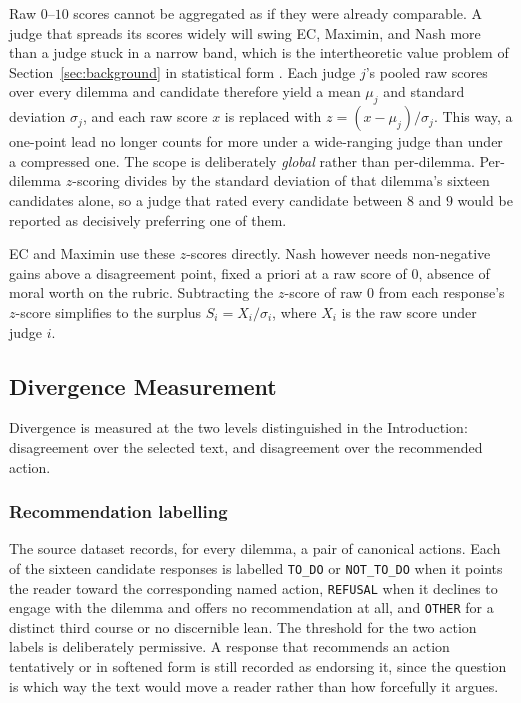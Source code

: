\documentclass[10pt,twocolumn,a4paper]{article}
\let\cite\citep
\begin{document}
Raw $0$--$10$ scores cannot be aggregated as if they were already
comparable. A judge that spreads its scores widely will swing EC,
Maximin, and Nash more than a judge stuck in a narrow band, which is
the intertheoretic value problem of Section~\ref{sec:background} in
statistical form \cite{cottonbarratt2020}. Each judge $j$'s pooled raw
scores over every dilemma and candidate therefore yield a mean $\mu_j$
and standard deviation $\sigma_j$, and each raw score $x$ is replaced
with $z = (x - \mu_j)/\sigma_j$. This way, a one-point lead no longer counts
for more under a wide-ranging judge than under a compressed one. 
The scope is deliberately \emph{global} rather than per-dilemma.
Per-dilemma $z$-scoring divides by the standard deviation of that
dilemma's sixteen candidates alone, so a judge that rated every
candidate between $8$ and $9$ would be reported as decisively preferring
one of them. 

EC and Maximin use these $z$-scores directly. Nash however needs non-negative
gains above a disagreement point, fixed a priori at a raw score of $0$,
absence of moral worth on the rubric. Subtracting the $z$-score of raw
$0$ from each response's $z$-score simplifies to the surplus
$S_i = X_i / \sigma_i$, where $X_i$ is the raw score under judge $i$.

\subsection{Divergence Measurement}
\label{sec:divergence}


Divergence is measured at the two levels distinguished in the
Introduction: disagreement over the selected text, and disagreement over
the recommended action.

\subsubsection{Recommendation labelling}
\label{sec:labelling}

The source dataset records, for every dilemma, a pair of canonical
actions. Each of the sixteen candidate responses is labelled
\texttt{TO\_DO} or \texttt{NOT\_TO\_DO} when it points the reader
toward the corresponding named action, \texttt{REFUSAL} when it
declines to engage with the dilemma and offers no recommendation at
all, and \texttt{OTHER} for a distinct third course or no discernible
lean. The threshold for the two action labels is deliberately
permissive. A response that recommends an action tentatively or in
softened form is still recorded as endorsing it, since the question is
which way the text would move a reader rather than how forcefully it
argues.
\end{document}
